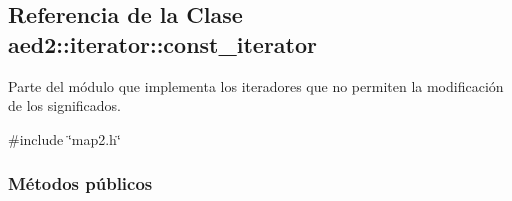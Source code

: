 \hypertarget{classaed2_1_1iterator_1_1const__iterator}{}\subsection{Referencia de la Clase aed2\+:\+:iterator\+:\+:const\+\_\+iterator}
\label{classaed2_1_1iterator_1_1const__iterator}


Parte del módulo que implementa los iteradores que no permiten la modificación de los significados.  




{\ttfamily \#include \char`\"{}map2.\+h\char`\"{}}

\subsubsection*{Métodos públicos}
